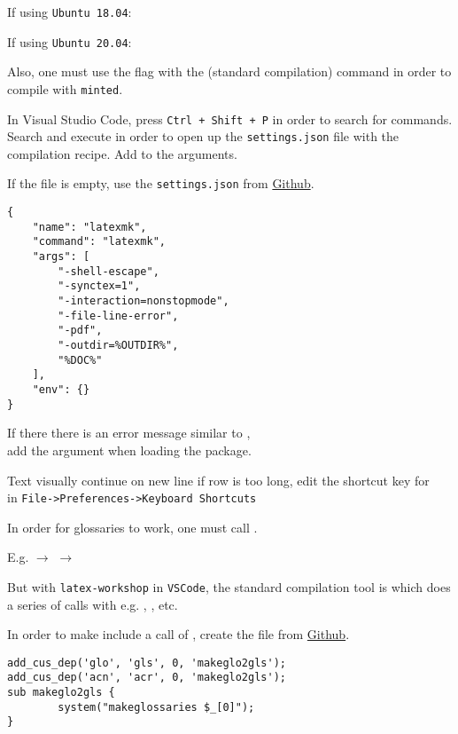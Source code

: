 If using \texttt{Ubuntu 18.04}:


If using \texttt{Ubuntu 20.04}:


Also, one must use the  flag with the  (standard compilation) command in order to compile with \texttt{minted}.

In Visual Studio Code, press \texttt{Ctrl + Shift + P} in order to search for commands. Search and execute  in order to open up the \texttt{settings.json} file with the compilation recipe. Add  to the arguments.

If the file is empty, use the \texttt{settings.json} from \href{https://github.com/robinhellmers/computer_setup/blob/master/latex-workshop/settings.json}{Github}.

\begin{verbatim}
{
    "name": "latexmk",
    "command": "latexmk",
    "args": [
        "-shell-escape",
        "-synctex=1",
        "-interaction=nonstopmode",
        "-file-line-error",
        "-pdf",
        "-outdir=%OUTDIR%",
        "%DOC%"
    ],
    "env": {}
}
\end{verbatim}

If there there is an error message similar to ,\\
add the argument  when loading the  package. 



Text visually continue on new line if row is too long, edit the shortcut key for\\ in \texttt{File->Preferences->Keyboard Shortcuts}


In order for glossaries to work, one must call .

E.g.   \(\rightarrow\)  \(\rightarrow\) 

But with \texttt{latex-workshop} in \texttt{VSCode}, the standard compilation tool is  which does a series of calls with e.g. , , etc.

In order to make  include a call of , create the file  from \href{https://github.com/robinhellmers/computer_setup}{Github}.

\begin{verbatim}
add_cus_dep('glo', 'gls', 0, 'makeglo2gls');
add_cus_dep('acn', 'acr', 0, 'makeglo2gls');
sub makeglo2gls {
        system("makeglossaries $_[0]");
}
\end{verbatim}